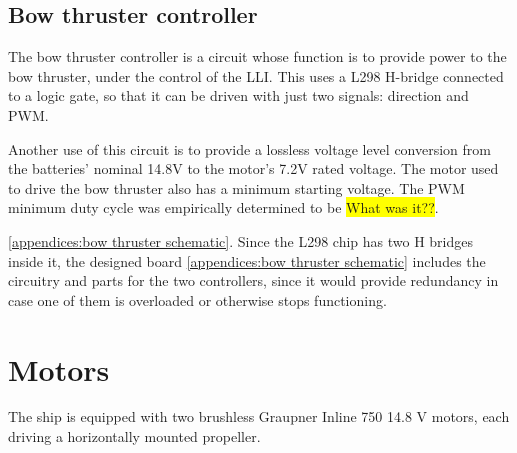	\subsection{Bow thruster controller}
	\label{subsec:bow thruster controller}
	
	The bow thruster controller is a circuit whose function is to provide power to the bow thruster, under the control of the \ac{LLI}. This uses a L298 H-bridge connected to a logic gate, so that it can be driven with just two signals: direction and \ac{PWM}.
	
	Another use of this circuit is to provide a lossless voltage level conversion from the batteries' nominal 14.8V to the motor's 7.2V rated voltage. %
	The motor used to drive the bow thruster also has a minimum starting voltage. The PWM minimum duty cycle was empirically determined to be \colorbox{yellow}{What was it??}.
	
	\ref{appendices:bow thruster schematic}. Since the L298 chip has two H bridges inside it, the designed board \ref{appendices:bow thruster schematic} includes the circuitry and parts for the two controllers, since it would provide redundancy in case one of them is overloaded or otherwise stops functioning.
	
\section{Motors}

The ship is equipped with two brushless Graupner Inline 750 14.8 V motors, each driving a horizontally mounted propeller.
